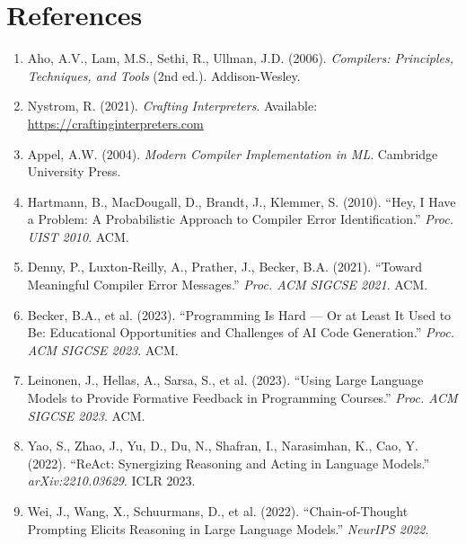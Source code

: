 \documentclass[a4paper,11pt]{article}
\begin{document}
\section*{References}

\begin{enumerate}
    \item Aho, A.V., Lam, M.S., Sethi, R., Ullman, J.D. (2006). \textit{Compilers: Principles, Techniques, and Tools} (2nd ed.). Addison-Wesley.

    \item Nystrom, R. (2021). \textit{Crafting Interpreters}. Available: \url{https://craftinginterpreters.com}

    \item Appel, A.W. (2004). \textit{Modern Compiler Implementation in ML}. Cambridge University Press.

    \item Hartmann, B., MacDougall, D., Brandt, J., Klemmer, S. (2010). ``Hey, I Have a Problem: A Probabilistic Approach to Compiler Error Identification.'' \textit{Proc. UIST 2010}. ACM.

    \item Denny, P., Luxton-Reilly, A., Prather, J., Becker, B.A. (2021). ``Toward Meaningful Compiler Error Messages.'' \textit{Proc. ACM SIGCSE 2021}. ACM.

    \item Becker, B.A., et al. (2023). ``Programming Is Hard --- Or at Least It Used to Be: Educational Opportunities and Challenges of AI Code Generation.'' \textit{Proc. ACM SIGCSE 2023}. ACM.

    \item Leinonen, J., Hellas, A., Sarsa, S., et al. (2023). ``Using Large Language Models to Provide Formative Feedback in Programming Courses.'' \textit{Proc. ACM SIGCSE 2023}. ACM.

    \item Yao, S., Zhao, J., Yu, D., Du, N., Shafran, I., Narasimhan, K., Cao, Y. (2022). ``ReAct: Synergizing Reasoning and Acting in Language Models.'' \textit{arXiv:2210.03629}. ICLR 2023.

    \item Wei, J., Wang, X., Schuurmans, D., et al. (2022). ``Chain-of-Thought Prompting Elicits Reasoning in Large Language Models.'' \textit{NeurIPS 2022}.


\end{enumerate}
\end{document}

